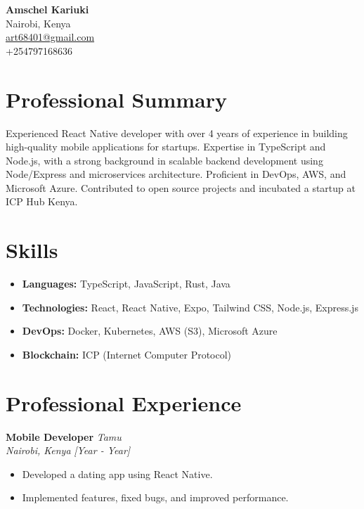 \documentclass[a4paper,10pt]{article}
\begin{document}
\begin{center}
    \textbf{\huge{Amschel Kariuki}}\\
    Nairobi, Kenya \\
    \href{mailto:art68401@gmail.com}{art68401@gmail.com} \\
    +254797168636 \\
    \vspace{0.5cm}
\end{center}

\section*{Professional Summary}
Experienced React Native developer with over 4 years of experience in building high-quality mobile applications for startups. Expertise in TypeScript and Node.js, with a strong background in scalable backend development using Node/Express and microservices architecture. Proficient in DevOps, AWS, and Microsoft Azure. Contributed to open source projects and incubated a startup at ICP Hub Kenya.

\section*{Skills}
\begin{itemize}
    \item \textbf{Languages:} TypeScript, JavaScript, Rust, Java
    \item \textbf{Technologies:} React, React Native, Expo, Tailwind CSS, Node.js, Express.js
    \item \textbf{DevOps:} Docker, Kubernetes, AWS (S3), Microsoft Azure
    \item \textbf{Blockchain:} ICP (Internet Computer Protocol)
\end{itemize}

\section*{Professional Experience}

\textbf{Mobile Developer} \hfill \textit{Tamu} \\
\textit{Nairobi, Kenya} \hfill \textit{[Year - Year]} \\
\begin{itemize}
    \item Developed a dating app using React Native.
    \item Implemented features, fixed bugs, and improved performance.
\end{itemize}
\end{document}
